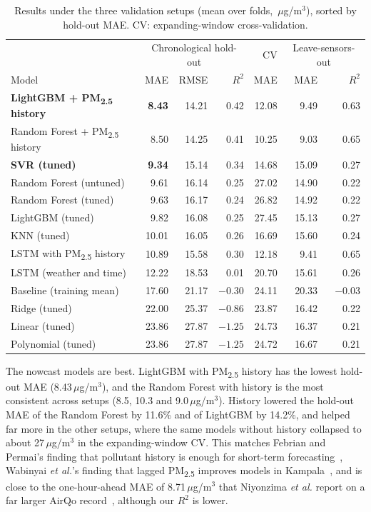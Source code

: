\documentclass{ieeeaccess}
\newcommand{\ugm}{\,$\mu$g/m$^{3}$}
\newcommand{\pmtwo}{PM\textsubscript{2.5}}
\begin{document}
\begin{table}[t]
\caption{Results under the three validation setups (mean over folds, \ugm), sorted by hold-out MAE. CV: expanding-window cross-validation.}
\label{tab:results}
\centering
\begin{tabular}{lrrrrrr}
\toprule
 & \multicolumn{3}{c}{Chronological hold-out} & CV & \multicolumn{2}{c}{Leave-sensors-out} \\
Model & MAE & RMSE & $R^2$ & MAE & MAE & $R^2$ \\
\midrule
\textbf{LightGBM + \pmtwo{} history} & \textbf{8.43} & 14.21 & 0.42 & 12.08 & 9.49 & 0.63 \\
Random Forest + \pmtwo{} history & 8.50 & 14.25 & 0.41 & 10.25 & 9.03 & 0.65 \\
\textbf{SVR (tuned)} & \textbf{9.34} & 15.14 & 0.34 & 14.68 & 15.09 & 0.27 \\
Random Forest (untuned) & 9.61 & 16.14 & 0.25 & 27.02 & 14.90 & 0.22 \\
Random Forest (tuned) & 9.63 & 16.17 & 0.24 & 26.82 & 14.92 & 0.22 \\
LightGBM (tuned) & 9.82 & 16.08 & 0.25 & 27.45 & 15.13 & 0.27 \\
KNN (tuned) & 10.01 & 16.05 & 0.26 & 16.69 & 15.60 & 0.24 \\
LSTM with \pmtwo{} history & 10.89 & 15.58 & 0.30 & 12.18 & 9.41 & 0.65 \\
LSTM (weather and time) & 12.22 & 18.53 & 0.01 & 20.70 & 15.61 & 0.26 \\
Baseline (training mean) & 17.60 & 21.17 & $-0.30$ & 24.11 & 20.33 & $-0.03$ \\
Ridge (tuned) & 22.00 & 25.37 & $-0.86$ & 23.87 & 16.42 & 0.22 \\
Linear (tuned) & 23.86 & 27.87 & $-1.25$ & 24.73 & 16.37 & 0.21 \\
Polynomial (tuned) & 23.86 & 27.87 & $-1.25$ & 24.72 & 16.67 & 0.21 \\
\bottomrule
\end{tabular}
\end{table}

The nowcast models are best. LightGBM with \pmtwo{} history has the lowest hold-out MAE (8.43\ugm), and the Random Forest with history is the most consistent across setups (8.5, 10.3 and 9.0\ugm). History lowered the hold-out MAE of the Random Forest by 11.6\% and of LightGBM by 14.2\%, and helped far more in the other setups, where the same models without history collapsed to about 27\ugm{} in the expanding-window CV. This matches Febrian and Permai's finding that pollutant history is enough for short-term forecasting~\cite{febrian2025}, Wabinyai \emph{et al.}'s finding that lagged \pmtwo{} improves models in Kampala~\cite{wabinyai2026}, and is close to the one-hour-ahead MAE of 8.71\ugm{} that Niyonzima \emph{et al.} report on a far larger AirQo record~\cite{niyonzima2026}, although our $R^2$ is lower.
\end{document}
